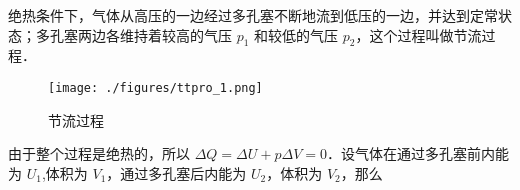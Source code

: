 

绝热条件下，气体从高压的一边经过多孔塞不断地流到低压的一边，并达到定常状态；多孔塞两边各维持着较高的气压 $p_1$ 和较低的气压 $p_2$，这个过程叫做节流过程．

\begin{figure}[ht]
\centering
\texttt{[image: ./figures/ttpro\_1.png]}
\caption{节流过程} \label{ttpro_fig1}
\end{figure}

由于整个过程是绝热的，所以 $\Delta Q=\Delta U+p\Delta V=0$．设气体在通过多孔塞前内能为 $U_1$,体积为 $V_1$，通过多孔塞后内能为 $U_2$，体积为 $V_2$，那么